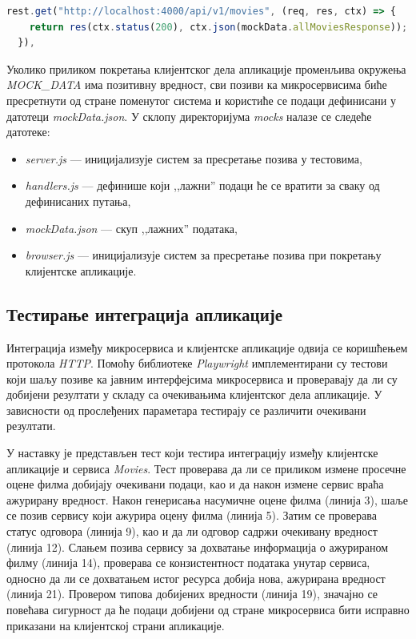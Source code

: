 \documentclass[12pt,oneside]{memoir}
\begin{document}
\newpage

\begin{lstlisting}[caption= Јединично тестирање \textit{BookPage} компоненте,
language=Javascript,
label={lst:mockHandler},
frame=single]
 rest.get("http://localhost:4000/api/v1/movies", (req, res, ctx) => {
    return res(ctx.status(200), ctx.json(mockData.allMoviesResponse));
  }),

\end{lstlisting}

Уколико приликом покретања клијентског дела апликације променљива окружења \textit{MOCK\_DATA} има позитивну вредност, сви позиви ка микросервисима биће пресретнути од стране поменутог система и користиће се подаци дефинисани у датотеци \textit{mockData.json}. У склопу директоријума \textit{mocks} налазе се следеће датотеке:

\begin{itemize}
\item \textit{server.js} --- иницијализује систем за пресретање позива у тестовима,
\item \textit{handlers.js} --- дефинише који ,,лажни” подаци ће се вратити за сваку од дефинисаних путања,
\item \textit{mockData.json} --- скуп ,,лажних” података,
\item \textit{browser.js} --- иницијализује систем за пресретање позива при покретању клијентске апликације.
\end{itemize}


\subsection{Тестирање интеграција апликације}

Интеграција између микросервиса и клијентске апликације одвија се коришћењем протокола \textit{HTTP}. Помоћу библиотеке \textit{Playwright} имплементирани су тестови који шаљу позиве ка јавним интерфејсима микросервиса и проверавају да ли су добијени резултати у складу са очекивањима клијентског дела апликације. У зависности од прослеђених параметара тестирају се различити очекивани резултати.

У наставку је представљен тест који тестира интеграцију између клијентске апликације и сервиса \textit{Movies}. Тест проверава да ли се приликом измене просечне оцене филма добијају очекивани подаци, као и да након измене сервис враћа ажурирану вредност.  Након генерисања насумичне оцене филма (линија 3), шаље се позив сервису који ажурира оцену филма (линија 5).  Затим се проверава статус одговора (линија 9), као и да ли одговор садржи очекивану вредност (линија 12).
Слањем позива сервису за дохватање информација о ажурираном филму (линија 14), проверава се конзистентност података унутар сервиса, односно да ли се дохватањем истог ресурса добија нова, ажурирана вредност (линија 21). Провером типова добијених вредности (линија 19), значајно се повећава сигурност да ће подаци добијени од стране микросервиса бити исправно приказани на клијентској страни апликације.
\end{document}
